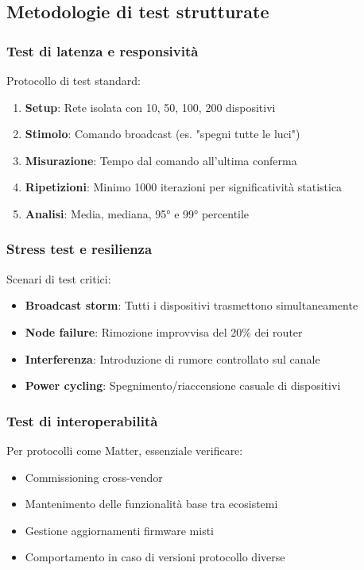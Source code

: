 \subsection{Metodologie di test strutturate}

\subsubsection{Test di latenza e responsività}

Protocollo di test standard:
\begin{enumerate}
    \item \textbf{Setup}: Rete isolata con 10, 50, 100, 200 dispositivi
    \item \textbf{Stimolo}: Comando broadcast (es. "spegni tutte le luci")
    \item \textbf{Misurazione}: Tempo dal comando all'ultima conferma
    \item \textbf{Ripetizioni}: Minimo 1000 iterazioni per significatività statistica
    \item \textbf{Analisi}: Media, mediana, 95° e 99° percentile
\end{enumerate}

\subsubsection{Stress test e resilienza}

Scenari di test critici:
\begin{itemize}
    \item \textbf{Broadcast storm}: Tutti i dispositivi trasmettono simultaneamente
    \item \textbf{Node failure}: Rimozione improvvisa del 20\% dei router
    \item \textbf{Interferenza}: Introduzione di rumore controllato sul canale
    \item \textbf{Power cycling}: Spegnimento/riaccensione casuale di dispositivi
\end{itemize}

\subsubsection{Test di interoperabilità}

Per protocolli come Matter, essenziale verificare:
\begin{itemize}
    \item Commissioning cross-vendor
    \item Mantenimento delle funzionalità base tra ecosistemi
    \item Gestione aggiornamenti firmware misti
    \item Comportamento in caso di versioni protocollo diverse
\end{itemize}

